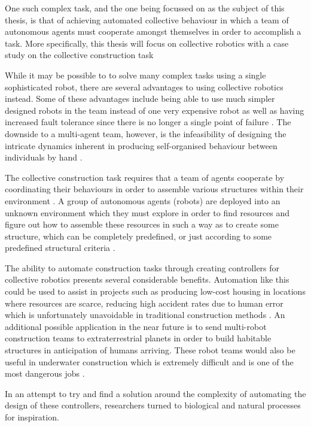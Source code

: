 One such complex task, and the one being focussed on as the subject of this thesis, is that of achieving automated collective behaviour in which a team of autonomous agents must cooperate amongst themselves in order to accomplish a task. More specifically, this thesis will focus on collective robotics with a case study on the collective construction task

While it may be possible to to solve many complex tasks using a single sophisticated robot, there are several advantages to using collective robotics instead. Some of these advantages include being able to use much simpler designed robots in the team instead of one very expensive robot as well as having increased fault tolerance since there is no longer a single point of failure \cite{chaimowicz2001architecture}. The downside to a multi-agent team, however, is the infeasibility of designing the intricate dynamics inherent in producing self-organised behaviour between individuals by hand \cite{RefWorks:11}.

The collective construction task requires that a team of agents cooperate by coordinating their behaviours in order to assemble various structures within their environment \cite{NitschkeSaEC2012}. A group of autonomous agents (robots) are deployed into an unknown environment which they must explore in order to find resources and figure out how to assemble these resources in such a way as to create some structure, which can be completely predefined, or just according to some predefined structural criteria \cite{NitschkeSaEC2012}.

The ability to automate construction tasks through creating controllers for collective robotics presents several considerable benefits. Automation like this could be used to assist in projects such as producing low-cost housing in locations where resources are scarce, reducing high accident rates due to human error which is unfortunately unavoidable in traditional construction methods \cite{ShenKhoshnevis2003}. An additional possible application in the near future is to send multi-robot construction teams to extraterrestrial planets in order to build habitable structures in anticipation of humans arriving. These robot teams would also be useful in underwater construction which is extremely difficult and is one of the most dangerous jobs \cite{RefWorks:30}.

In an attempt to try and find a solution around the complexity of automating the design of these controllers, researchers turned to biological and natural processes for inspiration.

